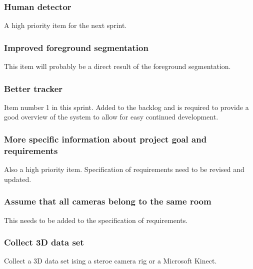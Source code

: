 \subsubsection{Human detector}
A high priority item for the next sprint.

\subsubsection{Improved foreground segmentation}
This item will probably be a direct result of the foreground segmentation.

\subsubsection{Better tracker}
Item number 1 in this sprint. Added to the backlog and is required to provide a good overview of the system to allow for easy continued development.

\subsubsection{More specific information about project goal and requirements}
Also a high priority item. Specification of requirements need to be revised and updated.

\subsubsection{Assume that all cameras belong to the same room}
This needs to be added to the specification of requirements.

\subsubsection{Collect 3D data set}
Collect a 3D data set ising a steroe camera rig or a Microsoft Kinect.
